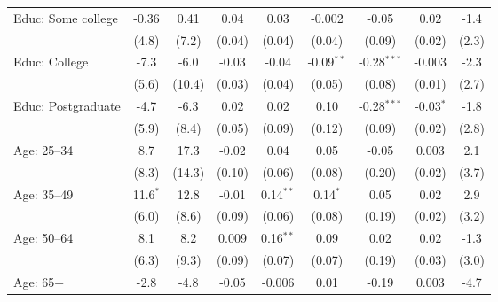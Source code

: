 \begin{adjustbox}{width = \textwidth, center}
\begin{tabular}{lcccccccc}
      Educ: Some college      & -0.36         & 0.41              & 0.04         & 0.03              & -0.002       & -0.05         & 0.02             & -1.4\\   
                              & (4.8)         & (7.2)             & (0.04)       & (0.04)            & (0.04)       & (0.09)        & (0.02)           & (2.3)\\   
      Educ: College           & -7.3          & -6.0              & -0.03        & -0.04             & -0.09$^{**}$ & -0.28$^{***}$ & -0.003           & -2.3\\   
                              & (5.6)         & (10.4)            & (0.03)       & (0.04)            & (0.05)       & (0.08)        & (0.01)           & (2.7)\\   
      Educ: Postgraduate      & -4.7          & -6.3              & 0.02         & 0.02              & 0.10         & -0.28$^{***}$ & -0.03$^{*}$      & -1.8\\   
                              & (5.9)         & (8.4)             & (0.05)       & (0.09)            & (0.12)       & (0.09)        & (0.02)           & (2.8)\\   
      Age: 25--34             & 8.7           & 17.3              & -0.02        & 0.04              & 0.05         & -0.05         & 0.003            & 2.1\\   
                              & (8.3)         & (14.3)            & (0.10)       & (0.06)            & (0.08)       & (0.20)        & (0.02)           & (3.7)\\   
      Age: 35--49             & 11.6$^{*}$    & 12.8              & -0.01        & 0.14$^{**}$       & 0.14$^{*}$   & 0.05          & 0.02             & 2.9\\   
                              & (6.0)         & (8.6)             & (0.09)       & (0.06)            & (0.08)       & (0.19)        & (0.02)           & (3.2)\\   
      Age: 50--64             & 8.1           & 8.2               & 0.009        & 0.16$^{**}$       & 0.09         & 0.02          & 0.02             & -1.3\\   
                              & (6.3)         & (9.3)             & (0.09)       & (0.07)            & (0.07)       & (0.19)        & (0.03)           & (3.0)\\   
      Age: 65+                & -2.8          & -4.8              & -0.05        & -0.006            & 0.01         & -0.19         & 0.003            & -4.7\\   

\end{tabular}
\end{adjustbox}
